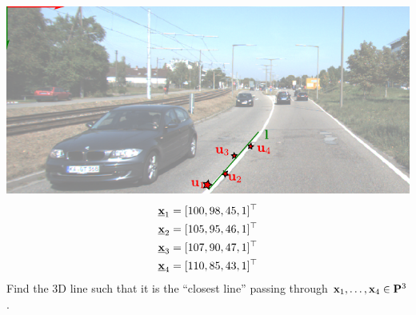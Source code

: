 \documentclass[times,t]{beamer}
\begin{document}
\begin{frame}

% 

\end{frame}
\begin{frame}
\end{frame}

\begin{frame}
  \includegraphics[width=\linewidth]{media/lane-from-points.pdf}
  \begin{align*}
    \underline{\mathbf{x}}_1 &= [100, 98, 45,1]^\top\\
    \underline{\mathbf{x}}_2 &= [105, 95, 46, 1]^\top\\
    \underline{\mathbf{x}}_3 &= [107, 90, 47,1]^\top\\
    \underline{\mathbf{x}}_4 &= [110, 85, 43,1]^\top
  \end{align*}
  Find  the 3D line such that it is the ``closest line'' passing through
  $\mathbf{x}_1, \dots, \mathbf{x}_4 \in \mathbf{P}^3$.
\end{frame}
\end{document}
